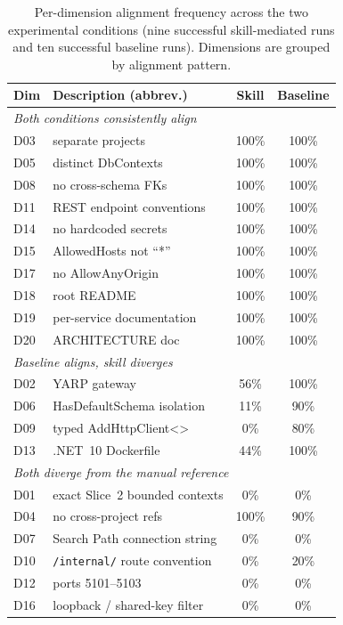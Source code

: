 \documentclass[journal]{IEEEtran}
\begin{document}
\begin{table}[t]
\caption{Per-dimension alignment frequency across the two
experimental conditions (nine successful skill-mediated runs and ten
successful baseline runs). Dimensions are grouped by alignment pattern.}
\label{tab:per-dim}
\centering
\small
\begin{tabular}{llcc}
\toprule
Dim & Description (abbrev.)         & Skill & Baseline \\
\midrule
\multicolumn{4}{l}{\textit{Both conditions consistently align}} \\
D03 & separate projects             & 100\% & 100\% \\
D05 & distinct DbContexts           & 100\% & 100\% \\
D08 & no cross-schema FKs           & 100\% & 100\% \\
D11 & REST endpoint conventions     & 100\% & 100\% \\
D14 & no hardcoded secrets          & 100\% & 100\% \\
D15 & AllowedHosts not ``*''        & 100\% & 100\% \\
D17 & no AllowAnyOrigin             & 100\% & 100\% \\
D18 & root README                   & 100\% & 100\% \\
D19 & per-service documentation     & 100\% & 100\% \\
D20 & ARCHITECTURE doc              & 100\% & 100\% \\
\midrule
\multicolumn{4}{l}{\textit{Baseline aligns, skill diverges}} \\
D02 & YARP gateway                  & 56\%  & 100\% \\
D06 & HasDefaultSchema isolation    & 11\%  &  90\% \\
D09 & typed AddHttpClient<>         &  0\%  &  80\% \\
D13 & .NET~10 Dockerfile            & 44\%  & 100\% \\
\midrule
\multicolumn{4}{l}{\textit{Both diverge from the manual reference}} \\
D01 & exact Slice~2 bounded contexts &  0\% &  0\% \\
D04 & no cross-project refs         & 100\% &  90\% \\
D07 & Search Path connection string &  0\% &  0\% \\
D10 & \texttt{/internal/} route convention &  0\% & 20\% \\
D12 & ports 5101--5103              &  0\% &  0\% \\
D16 & loopback / shared-key filter  &  0\% &  0\% \\
\bottomrule
\end{tabular}
\end{table}
\end{document}
